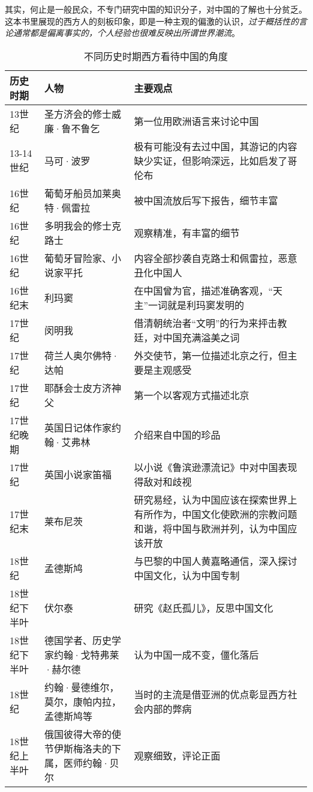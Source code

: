 其实，何止是一般民众，不专门研究中国的知识分子，对中国的了解也十分贫乏。这本书里展现的西方人的刻板印象，即是一种主观的偏激的认识，\emph{过于概括性的言论通常都是偏离事实的，个人经验也很难反映出所谓世界潮流}。

\begin{longtable}{p{}|p{}|p{}}
\caption{不同历史时期西方看待中国的角度}\\
\hline
历史时期 & 人物 & 主要观点 \\
\hline
\endhead

13世纪 & 圣方济会的修士威廉·鲁不鲁乞 & 第一位用欧洲语言来讨论中国 \\
13-14世纪 & 马可·波罗 & 极有可能没有去过中国，其游记的内容缺少实证，但影响深远，比如启发了哥伦布 \\
16世纪 & 葡萄牙船员加莱奥特·佩雷拉 & 被中国流放后写下报告，细节丰富 \\
16世纪 & 多明我会的修士克路士 & 观察精准，有丰富的细节 \\
16世纪 & 葡萄牙冒险家、小说家平托 & 内容全部抄袭自克路士和佩雷拉，恶意丑化中国人 \\
16世纪末 & 利玛窦 & 在中国曾为官，描述准确客观，“天主”一词就是利玛窦发明的 \\
17世纪 & 闵明我 & 借清朝统治者“文明”的行为来抨击教廷，对中国充满溢美之词 \\
17世纪 & 荷兰人奥尔佛特·达帕 & 外交使节，第一位描述北京之行，但主要是主观感受 \\
17世纪 & 耶酥会士皮方济神父 & 第一个以客观方式描述北京 \\
17世纪晚期 & 英国日记体作家约翰·艾弗林 & 介绍来自中国的珍品 \\
17世纪 & 英国小说家笛福 & 以小说《鲁滨逊漂流记》中对中国表现得敌对和歧视 \\
17世纪末 & 莱布尼茨 & 研究易经，认为中国应该在探索世界上有所作为，中国文化使欧洲的宗教问题和谐，将中国与欧洲并列，认为中国应该开放 \\
18世纪 & 孟德斯鸠 & 与巴黎的中国人黄嘉略通信，深入探讨中国文化，认为中国专制 \\
18世纪下半叶 & 伏尔泰 & 研究《赵氏孤儿》，反思中国文化 \\
18世纪下半叶 & 德国学者、历史学家约翰·戈特弗莱·赫尔德 & 认为中国一成不变，僵化落后 \\
18世纪 & 约翰·曼德维尔，莫尔，康帕内拉，孟德斯鸠等 & 当时的主流是借亚洲的优点彰显西方社会内部的弊病 \\
18世纪上半叶 & 俄国彼得大帝的使节伊斯梅洛夫的下属，医师约翰·贝尔 & 观察细致，评论正面 \\

\end{longtable}
